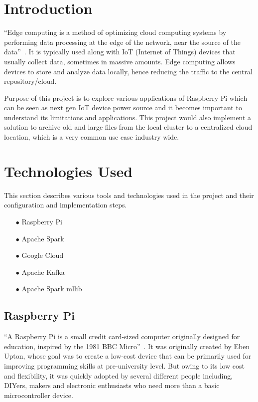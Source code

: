 \section{Introduction}

``Edge computing is a method of optimizing cloud computing systems by
performing data processing at the edge of the network, near the source
of the data''~\cite{hid-sp18-510-edge-wiki}. It is typically used
along with IoT (Internet of Things) devices that usually collect data,
sometimes in massive amounts. Edge computing allows devices to store
and analyze data locally, hence reducing the traffic to the central
repository/cloud.

Purpose of this project is to explore various applications of
Raspberry Pi which can be seen as next gen IoT device power source and
it becomes important to understand its limitations and
applications. This project would also implement a solution to archive
old and large files from the local cluster to a centralized cloud
location, which is a very common use case industry wide.

\section{Technologies Used}

This section describes various tools and technologies used in the
project and their configuration and implementation steps.

\begin{itemize}
	\item[$\bullet$] Raspberry Pi 
	\item[$\bullet$] Apache Spark 
	\item[$\bullet$] Google Cloud
	\item[$\bullet$] Apache Kafka	
	\item[$\bullet$] Apache Spark mllib	
\end{itemize}

\subsection{Raspberry Pi}

``A Raspberry Pi is a small credit card-sized computer originally
designed for education, inspired by the 1981 BBC
Micro''~\cite{hid-sp18-510-rpi}. It was originally created by Eben
Upton, whose goal was to create a low-cost device that can be
primarily used for improving programming skills at pre-university
level. But owing to its low cost and flexibility, it was quickly
adopted by several different people including, DIYers, makers and
electronic enthusiasts who need more than a basic microcontroller
device\cite{hid-sp18-510-rpi}.

